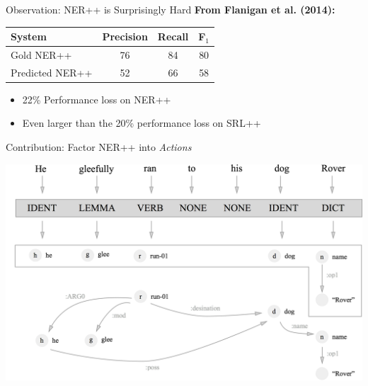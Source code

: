 \documentclass[hyperref]{beamer}
\newcommand\hh[1]{\textbf{\textcolor[rgb]{0.5,0,0}{#1}}}
\begin{document}
\begin{frame}[noframenumbering]{Observation: NER++ is Surprisingly Hard}
\hh{From Flanigan et al. (2014):}

\begin{center}
\begin{tabular}{lccc}
\hline
System & Precision & Recall & F$_1$ \\
\hline
Gold NER++      & 76 & 84 & 80 \\
Predicted NER++ & 52 & 66 & 58 \\
\hline
\end{tabular}
\end{center}

\begin{itemize}
\item 22\% Performance loss on NER++
\item Even larger than the 20\% performance loss on SRL++
\end{itemize}
\end{frame}

\begin{frame}{Contribution: Factor NER++ into \textit{Actions}}
\begin{center}
\includegraphics[scale=0.17]{concept.png}
\end{center}
\end{frame}
\end{document}
